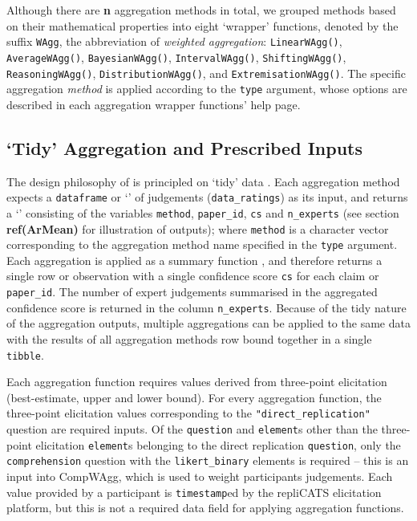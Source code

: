 \documentclass[article]{jss}
\newcommand{\class}[1]{`\code{#1}'}
\begin{document}
Although there are \textbf{n} aggregation methods in total, we grouped
methods based on their mathematical properties into eight `wrapper'
functions, denoted by the suffix \texttt{WAgg}, the abbreviation of
\emph{weighted aggregation}: \texttt{LinearWAgg()},
\texttt{AverageWAgg()}, \texttt{BayesianWAgg()},
\texttt{IntervalWAgg()}, \texttt{ShiftingWAgg()},
\texttt{ReasoningWAgg()}, \texttt{DistributionWAgg()}, and
\texttt{ExtremisationWAgg()}. The specific aggregation \emph{method} is
applied according to the \texttt{type} argument, whose options are
described in each aggregation wrapper functions' help page.

\hypertarget{tidy-aggregation-and-prescribed-inputs}{%
\subsection{`Tidy' Aggregation and Prescribed
Inputs}\label{tidy-aggregation-and-prescribed-inputs}}

The design philosophy of  is principled on `tidy' data
\citep{Wickham:2014vp}. Each aggregation method expects a
\texttt{dataframe} or \class{tibble} of judgements
(\texttt{data\_ratings}) as its input, and returns a \class{tibble}
consisting of the variables \texttt{method}, \texttt{paper\_id},
\texttt{cs} and \texttt{n\_experts} (see section \textbf{ref(ArMean)}
for illustration of outputs); where \texttt{method} is a character
vector corresponding to the aggregation method name specified in the
\texttt{type} argument. Each aggregation is applied as a summary
function \citep{Wickham2017R}, and therefore returns a single row or
observation with a single confidence score \texttt{cs} for each claim or
\texttt{paper\_id}. The number of expert judgements summarised in the
aggregated confidence score is returned in the column
\texttt{n\_experts}. Because of the tidy nature of the aggregation
outputs, multiple aggregations can be applied to the same data with the
results of all aggregation methods row bound together in a single
\texttt{tibble}.

Each aggregation function requires values derived from three-point
elicitation (best-estimate, upper and lower bound). For every
aggregation function, the three-point elicitation values corresponding
to the \texttt{"direct\_replication"} question are required inputs. Of
the \texttt{question} and \texttt{element}s other than the three-point
elicitation \texttt{element}s belonging to the direct replication
\texttt{question}, only the \texttt{comprehension} question with the
\texttt{likert\_binary} elements is required -- this is an input into
{CompWAgg}, which is used to weight participants judgements. Each value
provided by a participant is \texttt{timestamp}ed by the repliCATS
elicitation platform, but this is not a required data field for applying
aggregation functions.
\end{document}
